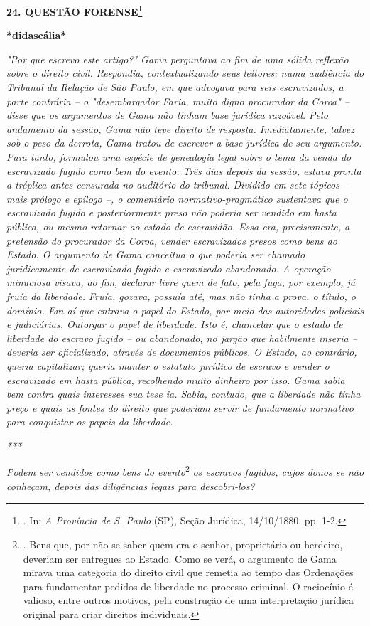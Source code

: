 \textbf{24. QUESTÃO FORENSE}\footnote{. In: \emph{A Província de S.
  Paulo} (SP), Seção Jurídica, 14/10/1880, pp. 1-2.}

\textbf{*didascália*}

\emph{"Por que escrevo este artigo?" Gama perguntava ao fim de uma
sólida reflexão sobre o direito civil. Respondia, contextualizando seus
leitores: numa audiência do Tribunal da Relação de São Paulo, em que
advogava para seis escravizados, a parte contrária -- o "desembargador
Faria, muito digno procurador da Coroa" -- disse que os argumentos de
Gama não tinham base jurídica razoável. Pelo andamento da sessão, Gama
não teve direito de resposta. Imediatamente, talvez sob o peso da
derrota, Gama tratou de escrever a base jurídica de seu argumento. Para
tanto, formulou uma espécie de genealogia legal sobre o tema da venda do
escravizado fugido como bem do evento. Três dias depois da sessão,
estava pronta a tréplica antes censurada no auditório do tribunal.
Dividido em sete tópicos -- mais prólogo e epílogo --, o comentário
normativo-pragmático sustentava que o escravizado fugido e
posteriormente preso não poderia ser vendido em hasta pública, ou mesmo
retornar ao estado de escravidão. Essa era, precisamente, a pretensão do
procurador da Coroa, vender escravizados presos como bens do Estado. O
argumento de Gama conceitua o que poderia ser chamado juridicamente de
escravizado fugido e escravizado abandonado. A operação minuciosa
visava, ao fim, declarar livre quem de fato, pela fuga, por exemplo, já
fruía da liberdade. Fruía, gozava, possuía até, mas não tinha a prova, o
título, o domínio. Era aí que entrava o papel do Estado, por meio das
autoridades policiais e judiciárias. Outorgar o papel de liberdade. Isto
é, chancelar que o estado de liberdade do escravo fugido -- ou
abandonado, no jargão que habilmente inseria -- deveria ser
oficializado, através de documentos públicos. O Estado, ao contrário,
queria capitalizar; queria manter o estatuto jurídico de escravo e
vender o escravizado em hasta pública, recolhendo muito dinheiro por
isso. Gama sabia bem contra quais interesses sua tese ia. Sabia,
contudo, que a liberdade não tinha preço e quais as fontes do direito
que poderiam servir de fundamento normativo para conquistar os papeis da
liberdade.}

\emph{***}

\emph{Podem ser vendidos como bens do evento}\footnote{. Bens que, por
  não se saber quem era o senhor, proprietário ou herdeiro, deveriam ser
  entregues ao Estado. Como se verá, o argumento de Gama mirava uma
  categoria do direito civil que remetia ao tempo das Ordenações para
  fundamentar pedidos de liberdade no processo criminal. O raciocínio é
  valioso, entre outros motivos, pela construção de uma interpretação
  jurídica original para criar direitos individuais.} \emph{os escravos
fugidos, cujos donos se não conheçam, depois das diligências legais para
descobri-los?}

